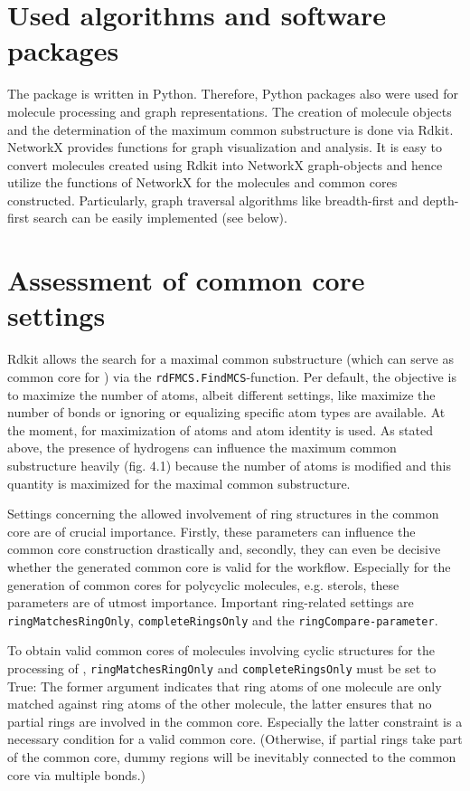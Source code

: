 \section{Used algorithms and software packages}

The {\trafo} package is written in Python. Therefore, Python packages
also were used for molecule processing and graph representations.
The creation of molecule objects and the determination of the maximum
common substructure is done via Rdkit\cite{key-3}. NetworkX\cite{AricA.Hagberg.2008}
provides functions for graph visualization and analysis. It is easy to convert molecules created using Rdkit into NetworkX graph-objects
and hence utilize the functions of NetworkX for the molecules and
common cores constructed. Particularly, graph traversal algorithms
like breadth-first and depth-first search can be easily implemented
(see below).

\section{Assessment of common core settings}

Rdkit allows the search for a maximal common substructure (which can
serve as common core for {\trafo}) via the \texttt{rdFMCS.FindMCS}-function.
Per default, the objective is to maximize the number of atoms, albeit
different settings, like maximize the number of bonds or ignoring
or equalizing specific atom types are available. At the moment, for
{\trafo} maximization of atoms and atom identity is used. As stated above, the presence of hydrogens can influence
the maximum common substructure heavily (fig. 4.1) because the number of atoms is modified and this quantity is maximized for the maximal common substructure. 


Settings concerning the allowed involvement of ring structures in
the common core are of crucial importance. Firstly, these parameters
can influence the common core construction drastically and, secondly, they
can even be decisive whether the generated common core is valid for the
{\trafo} workflow.
Especially for the generation of common cores for polycyclic molecules, e.g. sterols, these parameters are of utmost importance.  
Important ring-related settings are \texttt{ringMatchesRingOnly}, \texttt{completeRingsOnly}
and the \texttt{ringCompare-parameter}. 

To obtain valid common cores of molecules involving cyclic structures for the processing of {\trafo}, \texttt{ringMatchesRingOnly}
and \texttt{completeRingsOnly} must be set to True: The former argument indicates
that ring atoms of one molecule are only matched against ring atoms
of the other molecule, the latter ensures that no partial rings are
involved in the common core. Especially the latter constraint is a
necessary condition for a valid common core. (Otherwise, if partial
rings take part of the common core, dummy regions will be inevitably
connected to the common core via multiple bonds.)

